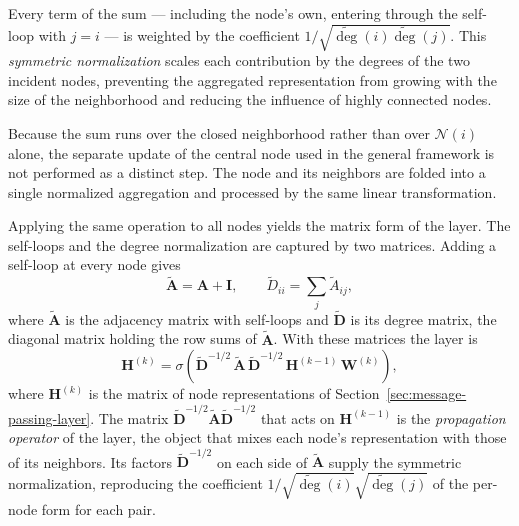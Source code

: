 Every term of the sum ---
including the node's own, entering through the self-loop with $j=i$ --- is weighted
by the coefficient $1/\!\sqrt{\widetilde{\deg}(i)\widetilde{\deg}(j)}$. This
\textit{symmetric normalization} scales each contribution by the degrees of the two
incident nodes, preventing the aggregated representation from growing with the size
of the neighborhood and reducing the influence of highly connected nodes. 

Because the sum runs over the closed neighborhood rather than over
$\mathcal{N}(i)$ alone, the separate update of the central node used in the general
framework is not performed as a distinct step. The node and its neighbors are
folded into a single normalized aggregation and processed by the same linear
transformation.

Applying the same operation to all nodes yields the matrix form of the layer.
The self-loops and the degree normalization are captured by two matrices.
Adding a self-loop at every node gives
\begin{equation}
  \tilde{\mathbf{A}} = \mathbf{A} + \mathbf{I},
  \qquad
  \tilde{D}_{ii} = \sum_{j} \tilde{A}_{ij},
  \label{eq:gcn-renormalization}
\end{equation}
where $\tilde{\mathbf{A}}$ is the adjacency matrix with self-loops and
$\tilde{\mathbf{D}}$ is its degree matrix, the diagonal matrix holding the row
sums of $\tilde{\mathbf{A}}$. With these matrices the layer is
\begin{equation}
  \mathbf{H}^{(k)} = \sigma\!\left(
    \tilde{\mathbf{D}}^{-1/2}\,
    \tilde{\mathbf{A}}\,
    \tilde{\mathbf{D}}^{-1/2}\,
    \mathbf{H}^{(k-1)}\,
    \mathbf{W}^{(k)}
  \right),
  \label{eq:gcn-matrix}
\end{equation}
where $\mathbf{H}^{(k)}$ is the matrix of node representations of
Section~\ref{sec:message-passing-layer}. The matrix
$\tilde{\mathbf{D}}^{-1/2}\tilde{\mathbf{A}}\tilde{\mathbf{D}}^{-1/2}$ that acts on
$\mathbf{H}^{(k-1)}$ is the \textit{propagation operator} of the layer, the object that
mixes each node's representation with those of its neighbors. Its factors
$\tilde{\mathbf{D}}^{-1/2}$ on each side of $\tilde{\mathbf{A}}$ supply the
symmetric normalization, reproducing the coefficient
$1/\!\sqrt{\widetilde{\deg}(i)}\sqrt{\widetilde{\deg}(j)}$
of the per-node form for each pair.
 
